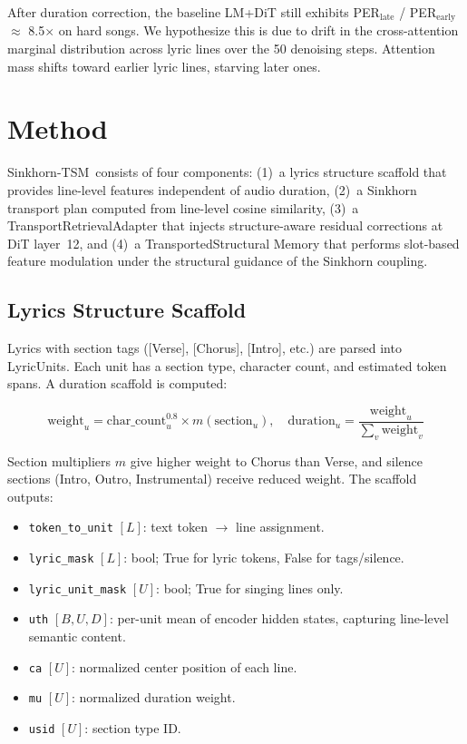\documentclass[11pt,a4paper]{article}
\newcommand{\method}{Sinkhorn-TSM}
\begin{document}
After duration correction, the baseline LM+DiT still exhibits PER$_{\text{late}}$ / PER$_{\text{early}}$ $\approx$ 8.5$\times$ on hard songs. We hypothesize this is due to drift in the cross-attention marginal distribution across lyric lines over the 50 denoising steps. Attention mass shifts toward earlier lyric lines, starving later ones.

\section{Method}
\label{sec:method}

\method~consists of four components: (1)~a lyrics structure scaffold that provides line-level features independent of audio duration, (2)~a Sinkhorn transport plan computed from line-level cosine similarity, (3)~a TransportRetrievalAdapter that injects structure-aware residual corrections at DiT layer~12, and (4)~a TransportedStructural Memory that performs slot-based feature modulation under the structural guidance of the Sinkhorn coupling.

\subsection{Lyrics Structure Scaffold}

Lyrics with section tags ([Verse], [Chorus], [Intro], etc.) are parsed into LyricUnits. Each unit has a section type, character count, and estimated token spans. A duration scaffold is computed:

\[
\text{weight}_u = \text{char\_count}_u^{0.8} \times m(\text{section}_u),
\quad
\text{duration}_u = \frac{\text{weight}_u}{\sum_v \text{weight}_v}
\]

Section multipliers $m$ give higher weight to Chorus than Verse, and silence sections (Intro, Outro, Instrumental) receive reduced weight. The scaffold outputs:

\begin{itemize}
    \item \texttt{token\_to\_unit} $[L]$: text token $\to$ line assignment.
    \item \texttt{lyric\_mask} $[L]$: bool; True for lyric tokens, False for tags/silence.
    \item \texttt{lyric\_unit\_mask} $[U]$: bool; True for singing lines only.
    \item \texttt{uth} $[B, U, D]$: per-unit mean of encoder hidden states, capturing line-level semantic content.
    \item \texttt{ca} $[U]$: normalized center position of each line.
    \item \texttt{mu} $[U]$: normalized duration weight.
    \item \texttt{usid} $[U]$: section type ID.
\end{itemize}
\end{document}
